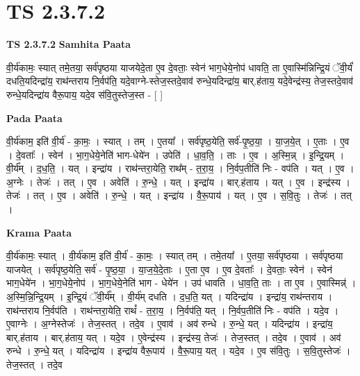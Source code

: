\documentclass[17pt]{extarticle}
\begin{document}
\section{ TS 2.3.7.2 }

\textbf{TS 2.3.7.2 } \newline
\textbf{Samhita Paata} \newline

वी॒र्य॑कामः॒ स्यात् तमे॒तया॒ सर्व॑पृष्ठया याजयेदे॒ता ए॒व दे॒वताः॒ स्वेन॑ भाग॒धेये॒नोप॑ धावति॒ ता ए॒वास्मि॑न्निन्द्रि॒यं ॅवी॒र्यं॑ दधति॒यदिन्द्रा॑य॒ राथ॑न्तराय नि॒र्वप॑ति॒ यदे॒वाग्ने-स्तेज॒स्तदे॒वाव॑ रुन्धे॒यदिन्द्रा॑य॒ बार्.ह॑ताय॒ यदे॒वेन्द्र॑स्य॒ तेज॒स्तदे॒वाव॑ रुन्धे॒यदिन्द्रा॑य वैरू॒पाय॒ यदे॒व स॑वि॒तुस्तेज॒स्त - [  ] \newline

\textbf{Pada Paata} \newline

वी॒र्य॑काम॒ इति॑ वी॒र्य॑ - का॒मः॒ । स्यात् । तम् । ए॒तया᳚ । सर्व॑पृष्ठ॒येति॒ सर्व॑-पृ॒ष्ठ॒या॒ । या॒ज॒ये॒त् । ए॒ताः । ए॒व । दे॒वताः᳚ । स्वेन॑ । भा॒ग॒धेये॒नेति॑ भाग-धेये॑न । उपेति॑ । धा॒व॒ति॒ । ताः । ए॒व । अ॒स्मि॒न्न् । इ॒न्द्रि॒यम् । वी॒र्य᳚म् । द॒ध॒ति॒ । यत् । इन्द्रा॑य । राथ॑न्तरा॒येति॒ राथ᳚म् - त॒रा॒य॒ । नि॒र्वप॒तीति॑ निः - वप॑ति । यत् । ए॒व । अ॒ग्नेः । तेजः॑ ।   तत् । ए॒व । अवेति॑ । रु॒न्धे॒ । यत् । इन्द्रा॑य । बार्.ह॑ताय । यत् । ए॒व । इन्द्र॑स्य । तेजः॑ । तत् । ए॒व । अवेति॑ ।   रु॒न्धे॒ । यत् । इन्द्रा॑य । वै॒रू॒पाय॑ । यत् । ए॒व । स॒वि॒तुः । तेजः॑ । तत् ।  \newline


\textbf{Krama Paata} \newline

वी॒र्य॑कामः॒ स्यात् । वी॒र्य॑काम॒ इति॑ वी॒र्य॑ - का॒मः॒ । स्यात् तम् । तमे॒तया᳚ । ए॒तया॒ सर्व॑पृष्ठया । सर्व॑पृष्ठया याजयेत् । सर्व॑पृष्ठ॒येति॒ सर्व॑ - पृ॒ष्ठ॒या॒ । या॒ज॒ये॒दे॒ताः । ए॒ता ए॒व । ए॒व दे॒वताः᳚ । दे॒वताः॒ स्वेन॑ । स्वेन॑ भाग॒धेये॑न । भा॒ग॒धेये॒नोप॑ । भा॒ग॒धेये॒नेति॑ भाग - धेये॑न । उप॑ धावति । धा॒व॒ति॒ ताः । ता ए॒व । ए॒वास्मिन्न्॑ । अ॒स्मि॒न्नि॒न्द्रि॒यम् । इ॒न्द्रि॒यं ॅवी॒र्य᳚म् । वी॒र्य॑म् दधति । द॒ध॒ति॒ यत् । यदिन्द्रा॑य । इन्द्रा॑य॒ राथ॑न्तराय । राथ॑न्तराय नि॒र्वप॑ति । राथ॑न्तरा॒येति॒ राथं᳚ - त॒रा॒य॒ । नि॒र्वप॑ति॒ यत् । नि॒र्वप॒तीति॑ निः - वप॑ति । यदे॒व । ए॒वाग्नेः । अ॒ग्नेस्तेजः॑ । तेज॒स्तत् । तदे॒व । ए॒वाव॑ । अव॑ रुन्धे । रु॒न्धे॒ यत् । यदिन्द्रा॑य । इन्द्रा॑य॒ बार्.ह॑ताय । बार्.ह॑ताय॒ यत् । यदे॒व । ए॒वेन्द्र॑स्य । इन्द्र॑स्य॒ तेजः॑ । तेज॒स्तत् । तदे॒व । ए॒वाव॑ । अव॑ रुन्धे । रु॒न्धे॒ यत् । यदिन्द्रा॑य । इन्द्रा॑य वैरू॒पाय॑ । वै॒रू॒पाय॒ यत् । यदे॒व । ए॒व स॑वि॒तुः । स॒वि॒तुस्तेजः॑ । तेज॒स्तत् । तदे॒व \newline
\end{document}
